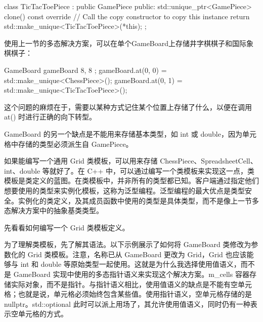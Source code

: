 \begin{cpp}
class TicTacToePiece : public GamePiece
{
    public:
        std::unique_ptr<GamePiece> clone() const override
        {
            // Call the copy constructor to copy this instance
            return std::make_unique<TicTacToePiece>(*this);
        }
};
\end{cpp}

使用上一节的多态解决方案，可以在单个GameBoard上存储井字棋棋子和国际象棋棋子：

\begin{cpp}
GameBoard gameBoard { 8, 8 };
gameBoard.at(0, 0) = std::make_unique<ChessPiece>();
gameBoard.at(0, 1) = std::make_unique<TicTacToePiece>();
\end{cpp}

这个问题的麻烦在于，需要以某种方式记住某个位置上存储了什么，以便在调用 at() 时进行正确的向下转型。

GameBoard 的另一个缺点是不能用来存储基本类型，如 int 或 double，因为单元格中存储的类型必须派生自 GamePiece。

如果能编写一个通用 Grid 类模板，可以用来存储 ChessPiece、SpreadsheetCell、int、double 等就好了。在 C++ 中，可以通过编写一个类模板来实现这一点，类模板是类定义的蓝图。在类模板中，并非所有的类型都已知。客户端通过指定他们想要使用的类型来实例化模板，这称为泛型编程。泛型编程的最大优点是类型安全。实例化的类定义，及其成员函数中使用的类型是具体类型，而不是像上一节多态解决方案中的抽象基类类型。

先看看如何编写一个 Grid 类模板定义。


为了理解类模板，先了解其语法。以下示例展示了如何将 GameBoard 类修改为参数化的 Grid 类模板。注意，名称已从 GameBoard 更改为 Grid，Grid 也应该能够与 int 和 double 等原始类型一起使用。这就是为什么我选择使用值语义，而不是 GameBoard 实现中使用的多态指针语义来实现这个解决方案。m\_cells 容器存储实际对象，而不是指针。与指针语义相比，使用值语义的缺点是不能有空单元格；也就是说，单元格必须始终包含某些值。使用指针语义，空单元格存储的是 nullptr。std::optional 此时可以派上用场了，其允许使用值语义，同时仍有一种表示空单元格的方式。


